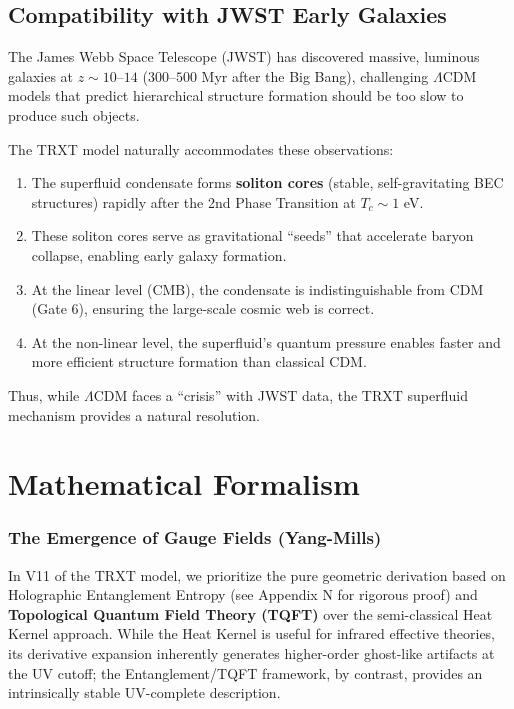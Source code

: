 \documentclass[a4paper,12pt]{article}
\begin{document}
\subsection{Compatibility with JWST Early Galaxies}
The James Webb Space Telescope (JWST) has discovered massive, luminous galaxies at $z \sim 10$--$14$ ($300$--$500$ Myr after the Big Bang), challenging $\Lambda$CDM models that predict hierarchical structure formation should be too slow to produce such objects.

The TRXT model naturally accommodates these observations:
\begin{enumerate}
    \item The superfluid condensate forms \textbf{soliton cores} (stable, self-gravitating BEC structures) rapidly after the 2nd Phase Transition at $T_c \sim 1$ eV.
    \item These soliton cores serve as gravitational ``seeds'' that accelerate baryon collapse, enabling early galaxy formation.
    \item At the linear level (CMB), the condensate is indistinguishable from CDM (Gate 6), ensuring the large-scale cosmic web is correct.
    \item At the non-linear level, the superfluid's quantum pressure enables faster and more efficient structure formation than classical CDM.
\end{enumerate}
Thus, while $\Lambda$CDM faces a ``crisis'' with JWST data, the TRXT superfluid mechanism provides a natural resolution.


\section{Mathematical Formalism}

\subsubsection{The Emergence of Gauge Fields (Yang-Mills)}
In V11 of the TRXT model, we prioritize the pure geometric derivation based on Holographic Entanglement Entropy (see Appendix N for rigorous proof) and \textbf{Topological Quantum Field Theory (TQFT)} over the semi-classical Heat Kernel approach. While the Heat Kernel is useful for infrared effective theories, its derivative expansion inherently generates higher-order ghost-like artifacts at the UV cutoff; the Entanglement/TQFT framework, by contrast, provides an intrinsically stable UV-complete description.
\end{document}
